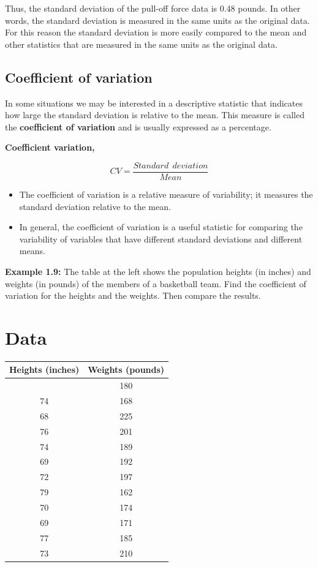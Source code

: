 \documentclass[
  11pt,
  letterpaper,
  DIV=11,
  numbers=noendperiod]{scrreprt}
\begin{document}
Thus, the standard deviation of the pull-off force data is 0.48 pounds.
In other words, the standard deviation is measured in the same units as
the original data. For this reason the standard deviation is more easily
compared to the mean and other statistics that are measured in the same
units as the original data.

\subsection{Coefficient of variation}\label{coefficient-of-variation}

In some situations we may be interested in a descriptive statistic that
indicates how large the standard deviation is relative to the mean. This
measure is called the \textbf{coefficient of variation} and is usually
expressed as a percentage.

\textbf{Coefficient variation,}

\[CV=\frac{Standard \ \ deviation}{Mean}\]

\begin{itemize}
\item
  The coefficient of variation is a relative measure of variability; it
  measures the standard deviation relative to the mean.
\item
  In general, the coefficient of variation is a useful statistic for
  comparing the variability of variables that have different standard
  deviations and different means.
\end{itemize}

\textbf{Example 1.9:} The table at the left shows the population heights
(in inches) and weights (in pounds) of the members of a basketball team.
Find the coefficient of variation for the heights and the weights. Then
compare the results.

\section{Data}

\begin{longtable}[]{@{}cc@{}}
\toprule\noalign{}
\textbf{Heights (inches)} & \textbf{Weights (pounds)} \\
\midrule\noalign{}
\endhead
\bottomrule\noalign{}
\endlastfoot
72 & 180 \\
74 & 168 \\
68 & 225 \\
76 & 201 \\
74 & 189 \\
69 & 192 \\
72 & 197 \\
79 & 162 \\
70 & 174 \\
69 & 171 \\
77 & 185 \\
73 & 210 \\
\end{longtable}
\end{document}
